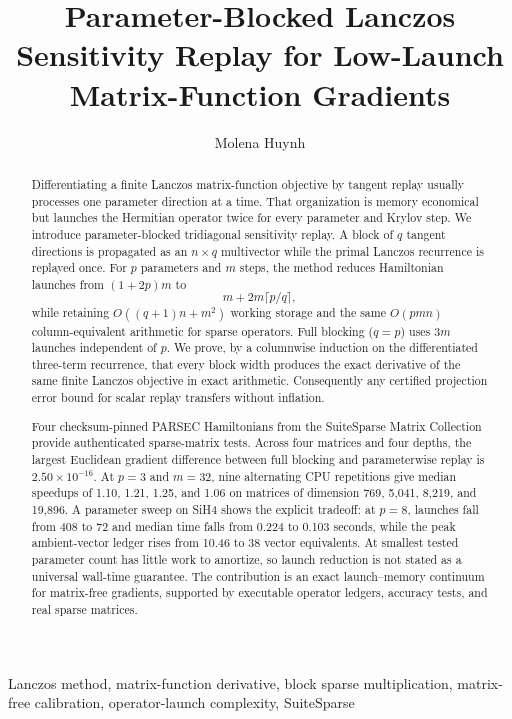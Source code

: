 \documentclass[10pt,letterpaper,twoside]{article}
\title{Parameter-Blocked Lanczos Sensitivity Replay for
Low-Launch Matrix-Function Gradients}
\author{Molena Huynh}
\affiliation{North Carolina State University}
\date{}
\begin{document}
\setlength{\emergencystretch}{2em}
\maketitle

\begin{abstract}
Differentiating a finite Lanczos matrix-function objective by tangent replay
usually processes one parameter direction at a time.  That organization is
memory economical but launches the Hermitian operator twice for every
parameter and Krylov step.  We introduce parameter-blocked tridiagonal
sensitivity replay.  A block of $q$ tangent directions is propagated as an
$n\times q$ multivector while the primal Lanczos recurrence is replayed once.
For $p$ parameters and $m$ steps, the method reduces Hamiltonian launches from
$(1+2p)m$ to
\[
 m+2m\lceil p/q\rceil,
\]
while retaining $O((q+1)n+m^2)$ working storage and the same
$O(pmn)$ column-equivalent arithmetic for sparse operators.  Full blocking
($q=p$) uses $3m$ launches independent of $p$.  We prove, by a columnwise
induction on the differentiated three-term recurrence, that every block width
produces the exact derivative of the same finite Lanczos objective in exact
arithmetic.  Consequently any certified projection error bound for scalar
replay transfers without inflation.

Four checksum-pinned PARSEC Hamiltonians from the SuiteSparse Matrix
Collection provide authenticated sparse-matrix tests.  Across four matrices
and four depths, the largest Euclidean gradient difference between full
blocking and parameterwise replay is $2.50\times10^{-16}$.  At $p=3$ and
$m=32$, nine alternating CPU repetitions give median speedups of 1.10, 1.21,
1.25, and 1.06 on matrices of dimension 769, 5,041, 8,219, and 19,896.  A
parameter sweep on SiH4 shows the explicit tradeoff: at $p=8$, launches fall
from 408 to 72 and median time falls from 0.224 to 0.103 seconds, while the
peak ambient-vector ledger rises from 10.46 to 38 vector equivalents.  At
smallest tested parameter count has little work to amortize, so launch
reduction is not stated as a universal wall-time guarantee.  The contribution is an exact
launch--memory continuum for matrix-free gradients, supported by executable
operator ledgers, accuracy tests, and real sparse matrices.
\end{abstract}

\begin{keywords}
Lanczos method, matrix-function derivative, block sparse multiplication,
matrix-free calibration, operator-launch complexity, SuiteSparse
\end{keywords}
\end{document}
